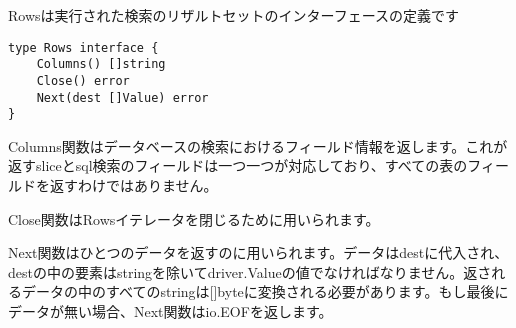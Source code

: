 Rowsは実行された検索のリザルトセットのインターフェースの定義です

\begin{lstlisting}[numbers=none]
type Rows interface {
    Columns() []string
    Close() error
    Next(dest []Value) error
}
\end{lstlisting}

Columns関数はデータベースの検索におけるフィールド情報を返します。これが返すsliceとsql検索のフィールドは一つ一つが対応しており、すべての表のフィールドを返すわけではありません。

Close関数はRowsイテレータを閉じるために用いられます。

Next関数はひとつのデータを返すのに用いられます。データはdestに代入され、destの中の要素はstringを除いてdriver.Valueの値でなければなりません。返されるデータの中のすべてのstringは[]byteに変換される必要があります。もし最後にデータが無い場合、Next関数はio.EOFを返します。
